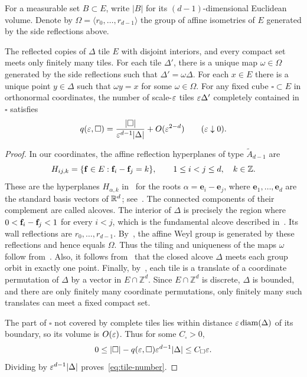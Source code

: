 \documentclass[11pt,letterpaper]{article}
\begin{document}
For a measurable set $B\subset E$, write $|B|$ for its $(d-1)$-dimensional Euclidean volume. Denote by $\Omega=\langle r_0,\ldots,r_{d-1}\rangle$ the group of affine isometries of $E$ generated by the side reflections above.
\begin{proposition}\label{prop:tiling}
      The reflected copies of $\Delta$ tile $E$ with disjoint interiors, and every compact set meets only finitely many tiles. For each tile $\Delta'$, there is a unique map $\omega\in \Omega$ generated by the side reflections such that $\Delta'=\omega\Delta$. For each $x\in E$ there is a unique point $y\in\Delta$ such that $\omega y=x$ for some $\omega\in \Omega$. For any fixed cube $\square\subset E$ in orthonormal coordinates, the number of scale-$\varepsilon$ tiles $\varepsilon\Delta'$ completely contained in $\square$ satisfies
      \begin{equation}\label{eq:tile-number}
            q(\varepsilon,\square)=\frac{|\square|}{\varepsilon^{d-1}|\Delta|}+O(\varepsilon^{2-d})\qquad(\varepsilon\downarrow0).
      \end{equation}
\end{proposition}
\begin{proof} In our coordinates, the affine reflection hyperplanes of type $\widetilde{A}_{d-1}$ are
      \[
            H_{ij,k}=\{\mathbf f\in E:\mathbf f_i-\mathbf f_j=k\},\qquad 1\le i<j\le d,\quad k\in\mathbb Z.
      \]
      These are the hyperplanes $H_{\alpha,k}$ in~\cite[Section~4.1]{Humphreys} for the roots $\alpha=\mathbf e_i-\mathbf e_j$, where $\mathbf e_1,\ldots,\mathbf e_d$ are the standard basis vectors of $\mathbb R^d$; see~\cite[Section~2.10]{Humphreys}. The connected components of their complement are called alcoves. The interior of $\Delta$ is precisely the region where $0<\mathbf f_i-\mathbf f_j<1$ for every $i<j$, which is the fundamental alcove described in~\cite[Section~4.3]{Humphreys}. Its wall reflections are $r_0,\ldots,r_{d-1}$. By~\cite[Proposition~4.3]{Humphreys}, the affine Weyl group is generated by these reflections and hence equals $\Omega$. Thus the tiling and uniqueness of the maps $\omega$ follow from~\cite[Proposition~4.3 and Theorem~4.5(c)]{Humphreys}. Also, it follows from~\cite[Theorem~4.8]{Humphreys} that the closed alcove $\Delta$ meets each group orbit in exactly one point. Finally, by~\cite[Proposition~4.2]{Humphreys}, each tile is a translate of a coordinate permutation of $\Delta$ by a vector in $E\cap\mathbb Z^d$. Since $E\cap\mathbb Z^d$ is discrete, $\Delta$ is bounded, and there are only finitely many coordinate permutations, only finitely many such translates can meet a fixed compact set.

      The part of $\square$ not covered by complete tiles lies within distance $\varepsilon\operatorname{diam}(\Delta)$ of its boundary, so its volume is $O(\varepsilon)$. Thus for some $C_\square>0$,
      \[
            0\le |\square|-q(\varepsilon,\square)\varepsilon^{d-1}|\Delta| \le C_{\square}\varepsilon.
      \]
      Dividing by $\varepsilon^{d-1}|\Delta|$ proves~\eqref{eq:tile-number}.
\end{proof}
\end{document}
